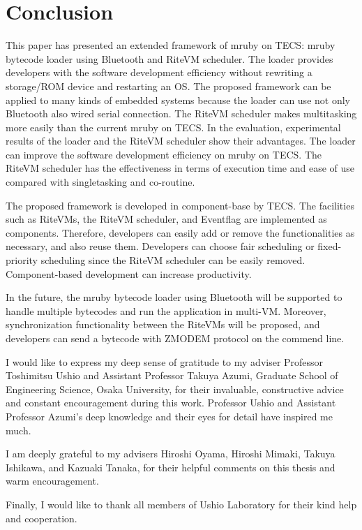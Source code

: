 \documentclass[a4j,12pt,oneside,openany,english]{jsbook}
\begin{document}
\chapter{Conclusion}
\label{sec:Conclusion}
This paper has presented an extended framework of mruby on TECS: mruby bytecode loader using Bluetooth and RiteVM scheduler.
The loader provides developers with the software development efficiency without rewriting a storage/ROM device and restarting an OS.
The proposed framework can be applied to many kinds of embedded systems  because the loader can use not only Bluetooth also wired serial connection.
The RiteVM scheduler makes multitasking more easily than the current mruby on TECS.
In the evaluation, experimental results of the loader and the RiteVM scheduler show their advantages.
The loader can improve the software development efficiency on mruby on TECS.
The RiteVM scheduler has the effectiveness in terms of execution time and ease of use compared with singletasking and co-routine.

The proposed framework is developed in component-base by TECS.
The facilities such as RiteVMs, the RiteVM scheduler, and Eventflag are implemented as components.
Therefore, developers can easily add or remove the functionalities as necessary, and also reuse them.
Developers can choose fair scheduling or fixed-priority scheduling since the RiteVM scheduler can be easily removed.
Component-based development can increase productivity.

In the future, the mruby bytecode loader using Bluetooth will be supported to handle multiple bytecodes and run the application in multi-VM.
Moreover, synchronization functionality between the RiteVMs will be proposed, and developers can send a bytecode with ZMODEM protocol on the commend line.

\begin{acknowledgement}
	I would like to express my deep sense of gratitude to my adviser Professor
	Toshimitsu Ushio and Assistant Professor Takuya Azumi, Graduate School of Engineering Science, Osaka University,
	for their invaluable, constructive advice and constant encouragement during this work.
	Professor Ushio and Assistant Professor Azumi's deep knowledge and their eyes for detail have inspired me much.

    I am deeply grateful to my advisers Hiroshi Oyama, Hiroshi Mimaki, Takuya Ishikawa, and Kazuaki Tanaka,
    for their helpful comments on this thesis and warm encouragement.

    Finally, I would like to thank all members of Ushio Laboratory for their kind help and cooperation.
\end{acknowledgement}
\end{document}
